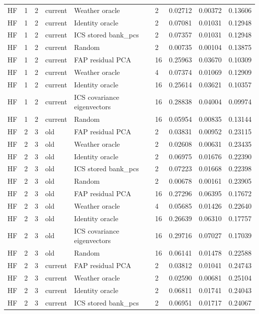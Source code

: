 \begin{tabular}{lllllllll}
HF & 1 & 2 & current & Weather oracle & 2 & 0.02712 & 0.00372 & 0.13606 \\
HF & 1 & 2 & current & Identity oracle & 2 & 0.07081 & 0.01031 & 0.12948 \\
HF & 1 & 2 & current & ICS stored bank\_pcs & 2 & 0.07357 & 0.01031 & 0.12948 \\
HF & 1 & 2 & current & Random & 2 & 0.00735 & 0.00104 & 0.13875 \\
HF & 1 & 2 & current & FAP residual PCA & 16 & 0.25963 & 0.03670 & 0.10309 \\
HF & 1 & 2 & current & Weather oracle & 4 & 0.07374 & 0.01069 & 0.12909 \\
HF & 1 & 2 & current & Identity oracle & 16 & 0.25614 & 0.03621 & 0.10357 \\
HF & 1 & 2 & current & ICS covariance eigenvectors & 16 & 0.28838 & 0.04004 & 0.09974 \\
HF & 1 & 2 & current & Random & 16 & 0.05954 & 0.00835 & 0.13144 \\
HF & 2 & 3 & old & FAP residual PCA & 2 & 0.03831 & 0.00952 & 0.23115 \\
HF & 2 & 3 & old & Weather oracle & 2 & 0.02608 & 0.00631 & 0.23435 \\
HF & 2 & 3 & old & Identity oracle & 2 & 0.06975 & 0.01676 & 0.22390 \\
HF & 2 & 3 & old & ICS stored bank\_pcs & 2 & 0.07223 & 0.01668 & 0.22398 \\
HF & 2 & 3 & old & Random & 2 & 0.00678 & 0.00161 & 0.23905 \\
HF & 2 & 3 & old & FAP residual PCA & 16 & 0.27296 & 0.06395 & 0.17672 \\
HF & 2 & 3 & old & Weather oracle & 4 & 0.05685 & 0.01426 & 0.22640 \\
HF & 2 & 3 & old & Identity oracle & 16 & 0.26639 & 0.06310 & 0.17757 \\
HF & 2 & 3 & old & ICS covariance eigenvectors & 16 & 0.29716 & 0.07027 & 0.17039 \\
HF & 2 & 3 & old & Random & 16 & 0.06141 & 0.01478 & 0.22588 \\
HF & 2 & 3 & current & FAP residual PCA & 2 & 0.03812 & 0.01041 & 0.24743 \\
HF & 2 & 3 & current & Weather oracle & 2 & 0.02590 & 0.00681 & 0.25104 \\
HF & 2 & 3 & current & Identity oracle & 2 & 0.06811 & 0.01741 & 0.24043 \\
HF & 2 & 3 & current & ICS stored bank\_pcs & 2 & 0.06951 & 0.01717 & 0.24067 \\

\end{tabular}
